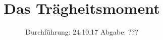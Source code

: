 

\subject{V101}
\title{Das Trägheitsmoment}
\date{%
  Durchführung: 24.10.17
  \hspace{3em}
  Abgabe: ???
}



\maketitle
\thispagestyle{empty}
\tableofcontents
\newpage







\printbibliography{}


